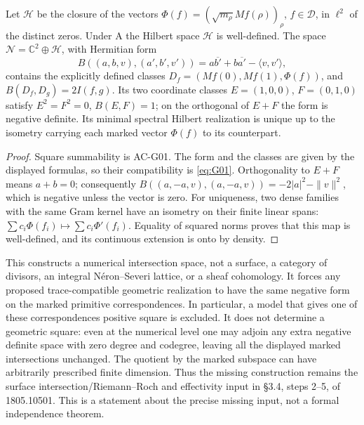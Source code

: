 \begin{proposition}
\label{AC-G02}
Let $\mathcal H$ be the closure of the vectors
$\Phi(f)=(\sqrt{m_\rho}Mf(\rho))_\rho$, $f\in\mathcal D$,
in $\ell^2$ of the distinct zeros.  Under A the Hilbert space
$\mathcal H$ is well-defined.  The space
$\mathcal N=\mathbb C^2\oplus\mathcal H$, with Hermitian form
\[
 B((a,b,v),(a',b',v'))=a\overline{b'}+b\overline{a'}-
 \langle v,v'\rangle,
\]
contains the explicitly defined classes
$D_f=(Mf(0),Mf(1),\Phi(f))$, and
$B(D_f,D_g)=2I(f,g)$.
Its two coordinate classes $E=(1,0,0)$, $F=(0,1,0)$ satisfy
$E^2=F^2=0$, $B(E,F)=1$; on the orthogonal of $E+F$ the form
is negative definite.  Its minimal spectral Hilbert realization is unique
up to the isometry carrying each marked vector $\Phi(f)$ to its counterpart.
\end{proposition}
\begin{proof}
Square summability is AC-G01.  The form and the classes are given by the
displayed formulas, so their compatibility is \eqref{eq:G01}.
Orthogonality to $E+F$ means $a+b=0$; consequently
$B((a,-a,v),(a,-a,v))=-2|a|^2-\|v\|^2$, which is negative
unless the vector is zero.  For uniqueness, two dense families with the
same Gram kernel have an isometry on their finite linear spans:
$\sum c_i\Phi(f_i)\mapsto\sum c_i\Phi'(f_i)$.
Equality of squared norms proves that this map is well-defined, and its
continuous extension is onto by density.
\end{proof}

This constructs a numerical intersection space, not a surface, a category
of divisors, an integral N\'eron--Severi lattice, or a sheaf cohomology.
It forces any proposed trace-compatible geometric realization to have the
same negative form on the marked primitive correspondences.  In particular,
a model that gives one of these correspondences positive square is excluded.
It does not determine a geometric square: even at the numerical level one
may adjoin any extra negative definite space with zero degree and codegree,
leaving all the displayed marked intersections unchanged.  The quotient
by the marked subspace can have arbitrarily prescribed finite dimension.
Thus the missing construction remains the surface intersection/Riemann--Roch
and effectivity input in \S3.4, steps 2--5, of 1805.10501.  This is a
statement about the precise missing input, not a formal independence theorem.


